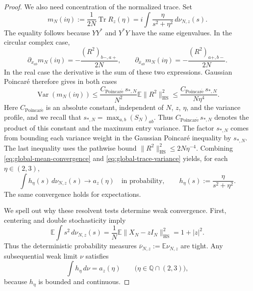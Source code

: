\documentclass[11pt,reqno]{amsart}
\numberwithin{equation}{section}
\theoremstyle{plain}
\theoremstyle{definition}
\theoremstyle{remark}
\begin{document}
\begin{proof}
We also need concentration of the normalized trace.  Set
\[
 m_N(i\eta):=\frac1{2N}\operatorname{Tr}R_z(\eta)
 =i\int\frac{\eta}{s^2+\eta^2}\,d\nu_{N,z}(s).
\]
The equality follows because $YY^*$ and $Y^*Y$ have the same eigenvalues.
In the circular complex case,
\[
 \partial_{x_{ab}}m_N(i\eta)
 =-\frac{(R^2)_{b-,a+}}{2N},\qquad
 \partial_{\overline{x}_{ab}}m_N(i\eta)
 =-\frac{(R^2)_{a+,b-}}{2N}.
\]
In the real case the derivative is the sum of these two expressions.
Gaussian Poincar\'e therefore gives in both cases
\begin{equation}\label{eq:global-trace-variance}
 \operatorname{Var}(m_N(i\eta))
 \le\frac{C_{\mathrm{Poincar\acute e}}\,s_{*,N}}{N^2}\mathbb E\|R^2\|_{\mathrm{HS}}^2
 \le\frac{C_{\mathrm{Poincar\acute e}}\,s_{*,N}}{N\eta^4}.
\end{equation}
Here $C_{\mathrm{Poincar\acute e}}$ is an absolute constant, independent of $N$, $z$, $\eta$,
and the variance profile, and we recall that
$s_{*,N}=\max_{a,b}(S_N)_{ab}$. Thus $C_{\mathrm{Poincar\acute e}}\,s_{*,N}$ denotes the
product of this constant and the maximum entry variance.
The factor $s_{*,N}$ comes from bounding each variance weight in the
Gaussian Poincar\'e inequality by $s_{*,N}$.
The last inequality uses the pathwise bound
$\|R^2\|_{\mathrm{HS}}^2\le2N\eta^{-4}$.  Combining
\eqref{eq:global-mean-convergence} and
\eqref{eq:global-trace-variance} yields, for each $\eta\in(2,3)$,
\begin{equation}\label{eq:global-resolvent-test}
 \int h_\eta(s)\,d\nu_{N,z}(s)
 \longrightarrow a_z(\eta)\quad\text{in probability},
 \qquad h_\eta(s):=\frac{\eta}{s^2+\eta^2}.
\end{equation}
The same convergence holds for expectations.

We spell out why these resolvent tests determine weak convergence.
First, centering and double stochasticity imply
\begin{equation}\label{eq:global-second-moment}
 \mathbb E\int s^2\,d\nu_{N,z}(s)
 =\frac1N\mathbb E\|X_N-zI_N\|_{\mathrm{HS}}^2
 =1+|z|^2.
\end{equation}
Thus the deterministic probability measures
$\overline\nu_{N,z}:=\mathbb E\nu_{N,z}$ are tight.  Any subsequential
weak limit $\nu$ satisfies
\begin{equation}\label{eq:global-measure-characterization}
 \int h_\eta\,d\nu=a_z(\eta)
 \qquad\bigl(\eta\in\mathbb Q\cap(2,3)\bigr),
\end{equation}
because $h_\eta$ is bounded and continuous.


\end{proof}
\end{document}
